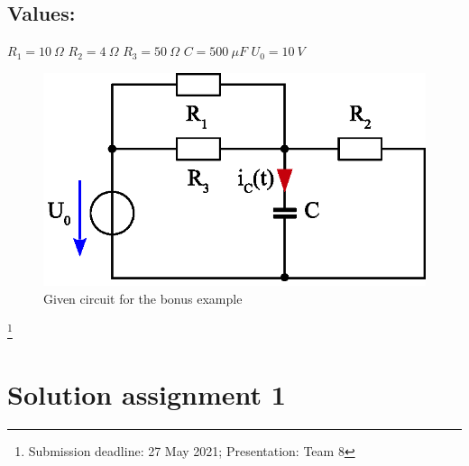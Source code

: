 \documentclass[a4paper]{article}
\newcommand\blfootnote[1]{%
	\begingroup
	\renewcommand\thefootnote{}\footnote{#1}%
	\addtocounter{footnote}{-1}%
	\endgroup
}
\begin{document}
\pagebreak
\subsection*{Values:}
$R_1 = 10~\Omega$ \qquad $R_2 = 4~\Omega$ \qquad $R_3 = 50~\Omega$ \qquad $C=500~\mu F$ \qquad $U_0 = 10~V$ \\

\begin{figure}[!htp]
	\centering
	\includegraphics[width=0.55\linewidth]{Figures/homework8_circuit_3}
	\caption{Given circuit for the bonus example}
	\label{fig:homework8circuitbonus}
\end{figure}

\blfootnote{Submission deadline: 27 May 2021; \qquad Presentation: Team 8}

\pagebreak

\section{Solution assignment 1}
\end{document}
